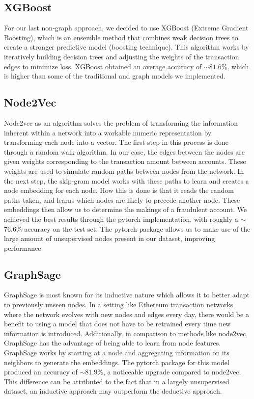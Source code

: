 \documentclass{article}
\begin{document}
\subsection{XGBoost}
        For our last non-graph approach, we decided to use XGBoost (Extreme Gradient Boosting), which is an ensemble method that combines weak decision trees to create a stronger predictive model (boosting technique). This algorithm works by iteratively building decision trees and adjusting the weights of the transaction edges to minimize loss. XGBoost obtained an average accuracy of $\sim$$81.6\%$, which is higher than some of the traditional and graph models we implemented. 


\subsection{Node2Vec}
	Node2vec as an algorithm solves the problem of transforming the information inherent within a network into a workable numeric representation by transforming each node into a vector. The first step in this process is done through a random walk algorithm. In our case, the edges between the nodes are given weights corresponding to the transaction amount between accounts. These weights are used to simulate random paths between nodes from the network. In the next step, the skip-gram model works with these paths to learn and creates a node embedding for each node. How this is done is that it reads the random paths taken, and learns which nodes are likely to precede another node. These embeddings then allow us to determine the makings of a fraudulent account. We achieved the best results through the pytorch implementation, with roughly a $\sim$$76.6\%$  accuracy on the test set. The pytorch package allows us to make use of the large amount of unsupervised nodes present in our dataset, improving performance.


\subsection{GraphSage}

	GraphSage is most known for its inductive nature which allows it to better adapt to previously unseen nodes. In a setting like Ethereum transaction networks where the network evolves with new nodes and edges every day, there would be a benefit to using a model that does not have to be retrained every time new information is introduced. Additionally, in comparison to methods like node2vec, GraphSage has the advantage of being able to learn from node features. GraphSage works by starting at a node and aggregating information on its neighbors to generate the embeddings. The pytorch package for this model produced an accuracy of $\sim$$81.9\%$, a noticeable upgrade compared to node2vec. This difference can be attributed to the fact that in a largely unsupervised dataset, an inductive approach may outperform the deductive approach.
\end{document}
